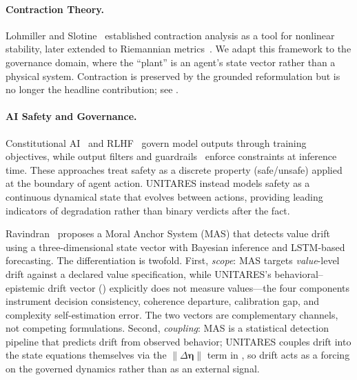 \documentclass[11pt,twocolumn]{article}
\newcommand{\norm}[1]{\left\lVert #1 \right\rVert}
\begin{document}
\paragraph{Contraction Theory.}
Lohmiller and Slotine~\cite{lohmiller1998contraction} established
contraction analysis as a tool for nonlinear stability, later
extended to Riemannian metrics~\cite{slotine2003modular}. We adapt
this framework to the governance domain, where the ``plant'' is
an agent's state vector rather than a physical system. Contraction
is preserved by the grounded reformulation but is no longer the
headline contribution; see .

\paragraph{AI Safety and Governance.}
Constitutional AI~\cite{bai2022constitutional} and
RLHF~\cite{ouyang2022training} govern model outputs through training
objectives, while output filters and guardrails~\cite{rebedea2023nemo}
enforce constraints at inference time. These approaches treat safety as
a discrete property (safe/unsafe) applied at the boundary of agent
action. UNITARES instead models safety as a continuous dynamical
state that evolves between actions, providing leading indicators of
degradation rather than binary verdicts after the fact.

Ravindran~\cite{ravindran2025moral} proposes a Moral Anchor System
(MAS) that detects value drift using a three-dimensional state
vector with Bayesian inference and LSTM-based forecasting. The
differentiation is twofold. First, \emph{scope}: MAS targets
\emph{value}-level drift against a declared value specification,
while UNITARES's behavioral--epistemic drift vector
() explicitly does not measure values---the
four components instrument decision consistency, coherence departure,
calibration gap, and complexity self-estimation error. The two
vectors are complementary channels, not competing formulations.
Second, \emph{coupling}: MAS is a statistical detection pipeline
that predicts drift from observed behavior; UNITARES couples drift
into the state equations themselves via the $\norm{\Delta\bm\eta}$
term in , so drift acts as a forcing on the
governed dynamics rather than as an external signal.
\end{document}
